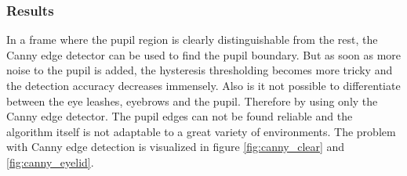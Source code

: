 \subsubsection{Results}
In a frame where the pupil region is clearly distinguishable from the rest, the Canny edge detector can be used to find the pupil boundary. But as soon as more noise to the pupil is added, the hysteresis thresholding becomes more tricky and the detection accuracy decreases immensely. Also is it not possible to differentiate between the eye leashes, eyebrows and the pupil. Therefore by using only the Canny edge detector. The pupil edges can not be found reliable and the algorithm itself is not adaptable to a great variety of environments. The problem with Canny edge detection is visualized in figure \ref{fig:canny_clear} and \ref{fig:canny_eyelid}.


